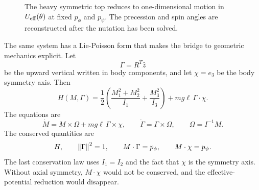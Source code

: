 \begin{figure}[htbp]
\centering
{}
\caption{The heavy symmetric top reduces to one-dimensional motion in
\(U_{\rm eff}(\theta)\) at fixed \(p_\phi\) and \(p_\psi\).  The precession and
spin angles are reconstructed after the nutation has been solved.}
\label{fig:heavy-top-effective-potential}
\end{figure}

The same system has a Lie-Poisson form that makes the bridge to geometric
mechanics explicit.  Let
\[
  \Gamma=R^T\hat z
\]
be the upward vertical written in body components, and let
\(\chi=e_3\) be the body symmetry axis.  Then
\[
  H(M,\Gamma)
  =
  \frac12\left(\frac{M_1^2+M_2^2}{I_1}+\frac{M_3^2}{I_3}\right)
  +
  mg\ell\,\Gamma\cdot\chi .
\]
The equations are
\[
  \dot M=M\times\Omega+mg\ell\,\Gamma\times\chi,
  \qquad
  \dot\Gamma=\Gamma\times\Omega,
  \qquad
  \Omega=I^{-1}M .
\]
The conserved quantities are
\[
  H,\qquad
  \left\lVert \Gamma\right\rVert^2=1,\qquad
  M\cdot\Gamma=p_\phi,\qquad
  M\cdot\chi=p_\psi .
\]
The last conservation law uses \(I_1=I_2\) and the fact that \(\chi\) is the
symmetry axis.  Without axial symmetry, \(M\cdot\chi\) would not be conserved,
and the effective-potential reduction would disappear.

